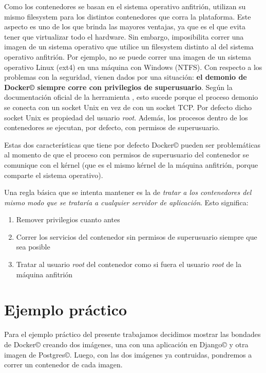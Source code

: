 \documentclass[14pt]{extarticle}
\newcommand{\docker}{Docker\copyright}
\begin{document}
        Como los contenedores se basan en el sistema operativo anfitrión, utilizan su mismo filesystem para los distintos contenedores que corra la plataforma. Este aspecto es uno de los que brinda las mayores ventajas, ya que es el que evita tener que virtualizar todo el hardware. Sin embargo, imposibilita correr una imagen de un sistema operativo que utilice un filesystem distinto al del sistema operativo anfitrión. Por ejemplo, no se puede correr una imagen de un sistema operativo Linux (ext4) en una máquina con Windows (NTFS).
        Con respecto a los problemas con la seguridad, vienen dados por una situación: \textbf{el demonio de \docker{} siempre corre con privilegios de superusuario}. Según la documentación oficial de la herramienta \cite{docs}, esto sucede porque el proceso demonio se conecta con un socket Unix en vez de con un socket TCP. Por defecto dicho socket Unix es propiedad del usuario \textit{root}. Además, los procesos dentro de los contenedores se ejecutan, por defecto, con permisos de superusuario.

        Estas dos características que tiene por defecto \docker{} pueden ser problemáticas al momento de que el proceso con permisos de superusuario del contenedor se comunique con el kérnel (que es el mismo kérnel de la máquina anfitrión, porque comparte el sistema operativo).  

        Una regla básica que se intenta mantener es la de \textit{tratar a los contenedores del mismo modo que se trataría a cualquier servidor de aplicación}. Esto significa:
        \begin{enumerate}
            \item Remover privilegios cuanto antes
            \item Correr los servicios del contenedor sin permisos de superusuario siempre que sea posible
            \item Tratar al usuario \textit{root} del contenedor como si fuera el usuario \textit{root} de la máquina anfitrión \cite{walsh}
        \end{enumerate}




    \clearpage
    \section{Ejemplo práctico}

    Para el ejemplo práctico del presente trabajamos decidimos mostrar las bondades de Docker\copyright{} creando dos imágenes, una con una aplicación en Django\copyright{} y otra imagen de Postgres\copyright{}. Luego, con las dos imágenes ya contruidas, pondremos a correr un contenedor de cada imagen. 
\end{document}
